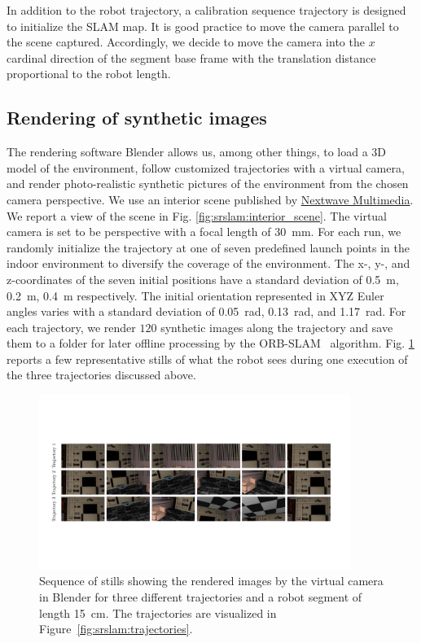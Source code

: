 In addition to the robot trajectory, a calibration sequence trajectory is designed to initialize the \gls{SLAM} map. 
It is good practice to move the camera parallel to the scene captured. Accordingly, we decide to move the camera into the $x$ cardinal direction of the segment base frame with the translation distance proportional to the robot length.

\subsection{Rendering of synthetic images}
The rendering software Blender allows us, among other things, to load a 3D model of the environment, follow customized trajectories with a virtual camera, and render photo-realistic synthetic pictures of the environment from the chosen camera perspective. We use an interior scene published by \href{https://www.nextwavemultimedia.com/html/3dblendermodel.html}{Nextwave Multimedia}. We report a view of the scene in Fig. \ref{fig:srslam:interior_scene}.
The virtual camera is set to be perspective with a focal length of \SI{30}{mm}.
For each run, we randomly initialize the trajectory at one of seven predefined launch points in the indoor environment to diversify the coverage of the environment.
The x-, y-, and z-coordinates of the seven initial positions have a standard deviation of \SI{0.5}{m}, \SI{0.2}{m}, \SI{0.4}{m} respectively. The initial orientation represented in XYZ Euler angles varies with a standard deviation of \SI{0.05}{rad}, \SI{0.13}{rad}, and \SI{1.17}{rad}.
For each trajectory, we render $120$ synthetic images along the trajectory and save them to a folder for later offline processing by the ORB-SLAM~\cite{mur2017orb} algorithm. Fig. \ref{fig:srslam:sequences_of_stills_simulations_cropped} reports a few representative stills of what the robot sees during one execution of the three trajectories discussed above.

\begin{figure}
    \centering
    \includegraphics[width=0.9\textwidth]{srslam/figures/graphic_sequences_of_stills_simulations_compressed.pdf}
    \caption{Sequence of stills showing the rendered images by the virtual camera in Blender for three different trajectories and a robot segment of length \SI{15}{cm}. The trajectories are visualized in Figure~\ref{fig:srslam:trajectories}.}
    \label{fig:srslam:sequences_of_stills_simulations_cropped}
\end{figure}

